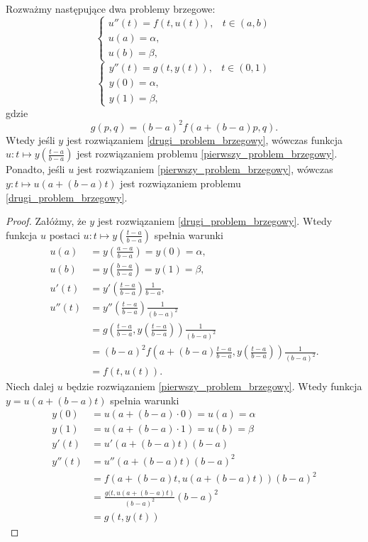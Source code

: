 \begin{theorem}
Rozważmy następujące dwa problemy brzegowe:
\begin{equation}\label{pierwszy_problem_brzegowy}
\left\{\begin{array}{ll}
u''(t)=f(t,u(t)), & t \in (a,b) \\
u(a)=\alpha, & \\
u(b)=\beta,
\end{array}\right.
\end{equation}
\begin{equation}\label{drugi_problem_brzegowy}
\left\{\begin{array}{ll}
y''(t)=g(t,y(t)), &  t \in (0,1)\\
y(0)= \alpha, & \\
y(1)= \beta,
\end{array}\right.
\end{equation}
gdzie 
$$
g(p,q) = (b-a)^2f(a+(b-a)p,q).
$$
Wtedy jeśli $y$ jest rozwiązaniem \eqref{drugi_problem_brzegowy}, wówczas funkcja $u: t \mapsto y\left(\frac{t-a}{b-a}\right)$ jest rozwiązaniem problemu \eqref{pierwszy_problem_brzegowy}. Ponadto, jeśli $u$ jest rozwiązaniem \eqref{pierwszy_problem_brzegowy}, wówczas $y: t \mapsto u(a+(b-a)t)$ jest rozwiązaniem problemu \eqref{drugi_problem_brzegowy}.
\end{theorem}
\begin{proof}
Załóżmy, że $y$ jest rozwiązaniem \eqref{drugi_problem_brzegowy}. Wtedy funkcja $u$ postaci $u: t \mapsto y\left(\frac{t-a}{b-a}\right)$ spełnia warunki
\begin{align*}
u(a) &= y\left(\frac{a-a}{b-a}\right)= y(0) = \alpha, \\
u(b) &= y\left(\frac{b-a}{b-a}\right)= y(1) = \beta, \\
u'(t) &= y'\left(\frac{t-a}{b-a}\right)\frac{1}{b-a}, \\
u''(t) &= y''\left(\frac{t-a}{b-a}\right)\frac{1}{(b-a)^2} \\
&= g\left(\frac{t-a}{b-a},y\left(\frac{t-a}{b-a}\right)\right) \frac{1}{(b-a)^2}\\
&= (b-a)^2f\left(a+(b-a)\frac{t-a}{b-a},y\left(\frac{t-a}{b-a}\right)\right)\frac{1}{(b-a)^2}. \\
&= f(t,u(t)).
\end{align*}
Niech dalej $u$ będzie rozwiązaniem \eqref{pierwszy_problem_brzegowy}. Wtedy funkcja $y = u(a+(b-a)t)$ spełnia warunki
\begin{align*}
y(0) &= u(a+(b-a)\cdot 0) = u(a) = \alpha \\
y(1) &= u(a+(b-a)\cdot 1) = u(b) = \beta \\
y'(t) &= u'(a+(b-a)t)(b-a) \\
y''(t) &=  u''(a+(b-a)t)(b-a)^2 \\
&= f(a+(b-a)t, u(a+(b-a)t))(b-a)^2 \\
&= \frac{g(t,u(a+(b-a)t)}{(b-a)^2}(b-a)^2 \\
&= g(t,y(t))
\end{align*}
\end{proof}

